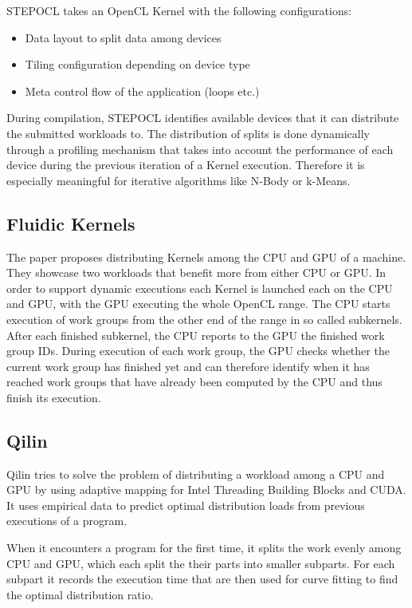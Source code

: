 STEPOCL takes an OpenCL Kernel with the following configurations:
\begin{itemize}
    \item Data layout to split data among devices
    \item Tiling configuration depending on device type
    \item Meta control flow of the application (loops etc.)
\end{itemize}

During compilation, STEPOCL identifies available devices that it can distribute the submitted workloads to. The distribution of splits is done dynamically through a profiling mechanism that takes into account the performance of each device during the previous iteration of a Kernel execution. Therefore it is especially meaningful for iterative algorithms like N-Body or k-Means.

\subsection{Fluidic Kernels\cite{fluidic}}

The paper proposes distributing Kernels among the CPU and GPU of a machine. They showcase two workloads that benefit more from either CPU or GPU. In order to support dynamic executions each Kernel is launched each on the CPU and GPU, with the GPU executing the whole OpenCL range. The CPU starts execution of work groups from the other end of the range in so called subkernels. After each finished subkernel, the CPU reports to the GPU the finished work group IDs. During execution of each work group, the GPU checks whether the current work group has finished yet and can therefore identify when it has reached work groups that have already been computed by the CPU and thus finish its execution.

\subsection{Qilin\cite{qilin}}

Qilin tries to solve the problem of distributing a workload among a CPU and GPU by using adaptive mapping for Intel Threading Building Blocks and CUDA. It uses empirical data to predict optimal distribution loads from previous executions of a program.

When it encounters a program for the first time, it splits the work evenly among CPU and GPU, which each split the their parts into smaller subparts. For each subpart it records the execution time that are then used for curve fitting to find the optimal distribution ratio.


